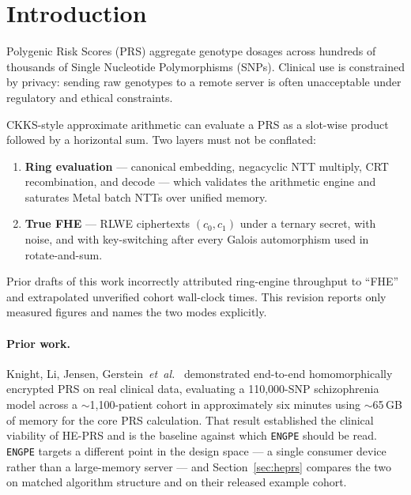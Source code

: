 \documentclass[11pt,a4paper]{article}
\newcommand{\engpe}{\texttt{ENGPE}}
\begin{document}
\section{Introduction}
\label{sec:intro}

Polygenic Risk Scores (PRS) aggregate genotype dosages across hundreds of
thousands of Single Nucleotide Polymorphisms (SNPs). Clinical use is constrained
by privacy: sending raw genotypes to a remote server is often unacceptable under
regulatory and ethical constraints.

CKKS-style approximate arithmetic can evaluate a PRS as a slot-wise product
followed by a horizontal sum. Two layers must not be conflated:
\begin{enumerate}
  \item \textbf{Ring evaluation} --- canonical embedding, negacyclic NTT multiply,
        CRT recombination, and decode --- which validates the arithmetic engine and
        saturates Metal batch NTTs over unified memory.
  \item \textbf{True FHE} --- RLWE ciphertexts $(c_0, c_1)$ under a ternary secret,
        with noise, and with key-switching after every Galois automorphism used in
        rotate-and-sum.
\end{enumerate}

Prior drafts of this work incorrectly attributed ring-engine throughput to
``FHE'' and extrapolated unverified cohort wall-clock times. This revision reports
only measured figures and names the two modes explicitly.

\paragraph{Prior work.}
Knight, Li, Jensen, Gerstein~\textit{et~al.}~\cite{knight2026heprs} demonstrated
end-to-end homomorphically encrypted PRS on real clinical data, evaluating a
110{,}000-SNP schizophrenia model across a $\sim$1{,}100-patient cohort in
approximately six minutes using $\sim$65\,GB of memory for the core PRS
calculation. That result established the clinical viability of HE-PRS and is the
baseline against which \engpe{} should be read. \engpe{} targets a different point
in the design space --- a single consumer device rather than a large-memory server
--- and Section~\ref{sec:heprs} compares the two on matched algorithm structure and
on their released example cohort.

\end{document}
